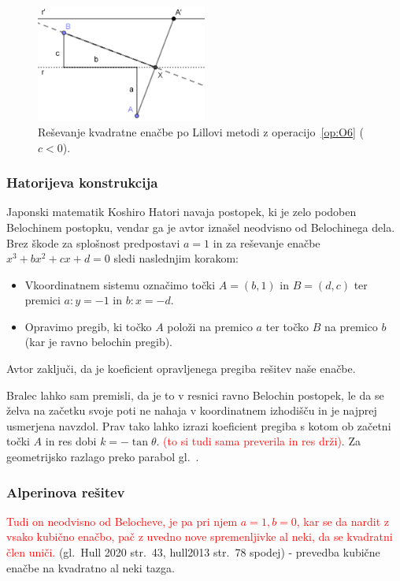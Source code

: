 \begin{figure}[h]
    \centering
    \includegraphics[width=0.5\textwidth]{images/kvadratna_enacba/kvadratna_enacba_lillova_metoda.png}
    \caption[Lillova metoda za kvadratno enačbo]{Reševanje kvadratne enačbe po Lillovi metodi z operacijo~\ref{op:O6} ($c < 0$).}
    \label{fig:kv_en_lill}
\end{figure}

\subsubsection{Hatorijeva konstrukcija}

Japonski matematik Koshiro Hatori navaja postopek, ki je zelo podoben Belochinem postopku, vendar ga je avtor iznašel neodvisno od Belochinega dela. Brez škode za splošnost predpostavi $a = 1$ in za reševanje enačbe $x^3 + bx^2 + cx + d = 0$ sledi naslednjim korakom:
\begin{itemize}
    \item Vkoordinatnem sistemu označimo točki $A = (b, 1)$ in $B = (d, c)$ ter premici $a: y = -1$ in $b: x = -d$.
    \item Opravimo pregib, ki točko $A$ položi na premico $a$ ter točko $B$ na premico $b$ (kar je ravno belochin pregib).
\end{itemize}
Avtor zaključi, da je koeficient opravljenega pregiba rešitev naše enačbe.

Bralec lahko sam premisli, da je to v resnici ravno Belochin postopek, le da se želva na začetku svoje poti ne nahaja v koordinatnem izhodišču in je najprej usmerjena navzdol. Prav tako lahko izrazi koeficient pregiba s kotom ob začetni točki $A$ in res dobi $k = - \tan \theta$. \textcolor{red}{(to si tudi sama preverila in res drži)}. Za geometrijsko razlago preko parabol gl.~\cite{hatori2003}.


\subsubsection{Alperinova rešitev}

\textcolor{red}{Tudi on neodvisno od Belocheve, je pa pri njem $a= 1, b = 0$, kar se da nardit z vsako kubično enačbo, pač z uvedno nove spremenljivke al neki, da se kvadratni člen uniči.} (gl.\ Hull 2020 str.\ 43, hull2013 str.\ 78 spodej) - prevedba kubične enačbe na kvadratno al neki tazga.